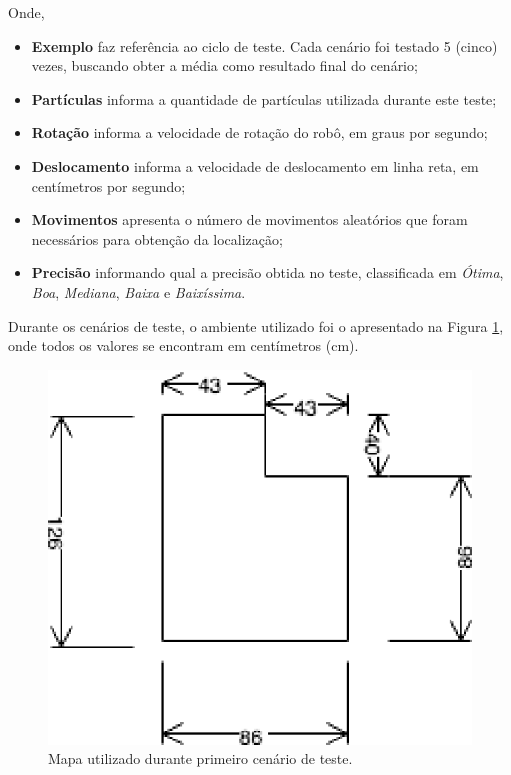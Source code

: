 Onde,
\begin{itemize}
  \item \textbf{Exemplo} faz referência ao ciclo de teste. Cada cenário foi testado 5 (cinco) vezes, buscando obter a média como resultado
  final do cenário;

  \item \textbf{Partículas} informa a quantidade de partículas utilizada durante este teste;

  \item \textbf{Rotação} informa a velocidade de rotação do robô, em graus por segundo;

  \item \textbf{Deslocamento} informa a velocidade de deslocamento em linha reta, em centímetros por segundo;

  \item \textbf{Movimentos} apresenta o número de movimentos aleatórios que foram necessários para obtenção da localização;

  \item \textbf{Precisão} informando qual a precisão obtida no teste, classificada em \textit{Ótima}, \textit{Boa}, \textit{Mediana},
  \textit{Baixa} e \textit{Baixíssima}.
\end{itemize}

Durante os cenários de teste, o ambiente utilizado foi o apresentado na Figura \ref{img:map1}, onde todos os
valores se encontram em centímetros (cm).

\begin{figure}[H]
	\centering
	\includegraphics[scale=1.3]{figuras/map1.eps}
	\caption[Primeiro Cenário de Teste]{Mapa utilizado durante primeiro cenário de teste.}
	\label{img:map1}
\end{figure}

